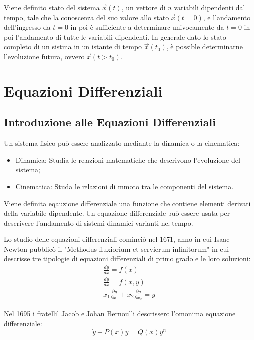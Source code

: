 \documentclass{article}
\numberwithin{equation}{subsection}
\begin{document}
Viene definito stato del sistema $\vec{x}(t)$, un vettore di $n$ variabili dipendenti dal tempo, tale che la conoscenza del suo valore 
allo stato $\vec{x}(t=0)$, e l'andamento dell'ingresso da $t=0$ in poi è sufficiente a determinare univocamente da $t=0$ in poi l'andamento di tutte le 
variabili dipendenti. 
In generale dato lo stato completo di un sistma in un istante di tempo $\vec{x}(t_0)$, è possible determinarne l'evoluzione futura, ovvero 
$\vec{x}(t>t_0)$. 

\clearpage

\section{Equazioni Differenziali}

\subsection{Introduzione alle Equazioni Differenziali}

Un sistema fisico può essere analizzato mediante la dinamica o la cinematica:
\begin{itemize}
    \item Dinamica: Studia le relazioni matematiche che descrivono l'evoluzione del sistema;
    \item Cinematica: Studa le relazioni di mmoto tra le componenti del sistema.
\end{itemize} 


Viene definita eqauzione differenziale una funzione che contiene elementi derivati della variabile dipendente. 
Un equazione differenziale può essere usata per descrivere l'andamento di sistemi dinamici varianti nel tempo. 


Lo studio delle equazioni differenziali cominciò nel $1671$, anno in cui Isaac Newton pubblicò il "Methodus fluxiorium et servierum infinitorum" in cui descrisse tre 
tipologie di equazioni differenziali di primo grado e le loro soluzioni: 
\begin{gather}
    \displaystyle\frac{dy}{dx}=f(x)\\
    \displaystyle\frac{dy}{dx}=f(x,y)\\
    x_1\displaystyle\frac{\partial y}{\partial x_1}+x_2\frac{\partial y}{\partial x_2}=y
\end{gather}



Nel 1695 i fratellil Jacob e Johan Bernoulli descrissero l'omonima equazione differenziale:
\begin{equation}
    \dot y+P(x)y=Q(x)y^n
\end{equation}
\end{document}
